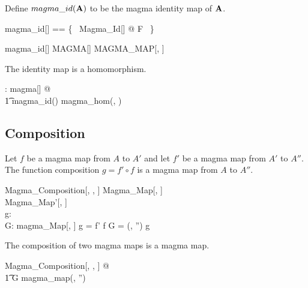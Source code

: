 \documentclass{amsart}
\begin{document}
Define $magma\_id(\mathbf{A})$ to be the magma identity map of $\mathbf{A}$.

\begin{zed}
	magma\_id[\genT] == \{~ Magma\_Id[\genT] @ \strucA \mapsto F  ~\} 
\end{zed}

\begin{remark}
\begin{zed}
magma\_id[\setT] \in MAGMA[\setT] \pfun MAGMA\_MAP[\setT, \setT]
\end{zed}
\end{remark}

\begin{remark}

The identity map is a homomorphism.

\begin{zed}
	\forall \strucA: magma[\setT] @ \\
	\t1	magma\_id(\strucA) \in magma\_hom(\strucA, \strucA)
\end{zed}

\end{remark}

\subsection{Composition}

Let $f$ be a magma map from $A$ to $A'$ and let $f'$ be a magma map from $A'$ to $A''$.
The function composition $g = f' \circ f$ is a magma map from $A$ to $A''$.

\begin{schema}{Magma\_Composition}[\genT, \genU, \genV]
	Magma\_Map[\genT, \genU] \\
	Magma\_Map'[\genU, \genV] \\
	g: \genT \pfun \genV  \\
	G: magma\_Map[\genT, \genV]
\where
	g = f' \circ f
\also
	G = (\strucA, \strucA'') \mapsto g
\end{schema}

\begin{remark}
The composition of two magma maps is a magma map.

\begin{zed}
	\forall Magma\_Composition[\setT, \setU, \setV] @ \\
	\t1	G \in magma\_map(\strucA, \strucA'')
\end{zed}

\end{remark}
\end{document}
